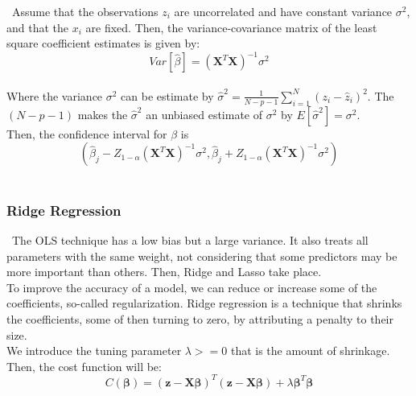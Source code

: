 \qquad \, Assume that the observations $z_i$ are uncorrelated and have constant variance $\sigma^2$, and that the $x_i$ are fixed. Then, the variance-covariance matrix of the least square coefficient estimates is given by: \\

\begin{equation}
\label{eq5}
Var[\hat{\beta}]=(\textbf{X}^T\textbf{X})^{-1}\sigma^2
\end{equation}\\

Where the variance $\sigma^2$ can be estimate by $\hat{\sigma}^2=\frac{1}{N-p-1}\sum^N_{i=1}(z_i-\hat{z}_i)^2$. The $(N-p-1)$ makes the $\hat{\sigma}^2$ an unbiased estimate of $\sigma^2$ by $E[\hat{\sigma}^2]=\sigma^2$.\\

Then, the confidence interval for $\beta$ is\\

\begin{equation}
\label{eq6}
(\hat{\beta}_j-Z_{1-\alpha}(\textbf{X}^T\textbf{X})^{-1}\sigma^2, \hat{\beta}_j+ Z_{1-\alpha}(\textbf{X}^T\textbf{X})^{-1}\sigma^2)
\end{equation}\\

\subsubsection{Ridge Regression}
\label{chap:Ridge Regression}

\quad \, The OLS technique has a low bias but a large variance. It also treats all parameters with the same weight, not considering that some predictors may be more important than others. Then, Ridge and Lasso take place.\\

To improve the accuracy of a model, we can reduce or increase some of the coefficients, so-called regularization. Ridge regression is a technique that shrinks the coefficients, some of then turning to zero, by attributing a penalty to their size.\\

We introduce the tuning parameter $\lambda>=0$ that is the amount of shrinkage. Then, the cost function will be:\\

$$C(\boldsymbol{\beta}) = (\boldsymbol{z} - \boldsymbol{X\beta})^T(\boldsymbol{z} - \boldsymbol{X\beta}) + \lambda \boldsymbol{\beta}^T\boldsymbol{\beta}$$\\

